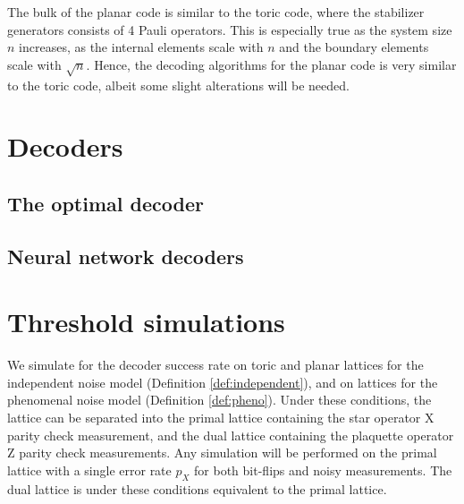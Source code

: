 The bulk of the planar code is similar to the toric code, where the stabilizer generators consists of 4 Pauli operators. This is especially true as the system size $n$ increases, as the internal elements scale with $n$ and the boundary elements scale with $\sqrt{n}$. Hence, the decoding algorithms for the planar code is very similar to the toric code, albeit some slight alterations will be needed. 


\section{Decoders}\label{sec:surface_decoders}

\subsection{The optimal decoder}\label{sec:optimal_decoder}

\subsection{Neural network decoders}

\section{Threshold simulations}\label{sec:simthres}

We simulate for the decoder success rate on toric and planar lattices for the independent noise model (Definition \ref{def:independent}), and on lattices for the phenomenal noise model (Definition \ref{def:pheno}). Under these conditions, the lattice can be separated into the primal lattice containing the star operator X parity check measurement, and the dual lattice containing the plaquette operator Z parity check measurements. Any simulation will be performed on the primal lattice with a single error rate $p_X$ for both bit-flips and noisy measurements. The dual lattice is under these conditions equivalent to the primal lattice. 

